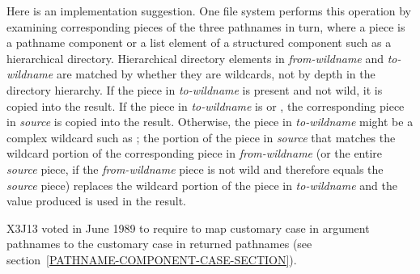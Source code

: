 \begin{newer}
\begin{defun}[Function]
    Here is an implementation suggestion.   One file system performs this operation by
    examining corresponding pieces of the three pathnames in turn, where a piece is a
    pathname component or a list element of a structured component such as
    a hierarchical directory.  Hierarchical directory elements in
    \emph{from-wildname} and \emph{to-wildname} are matched by whether they are
    wildcards, not by depth in the directory hierarchy.  If the piece in
    \emph{to-wildname} is present and not wild, it is copied into the result.
    If the piece in \emph{to-wildname} is  or , the corresponding
    piece in \emph{source} is
    copied into the result.  Otherwise, the piece in \emph{to-wildname} might be
    a complex wildcard such as ; the portion of the piece in \emph{source}
    that matches the
    wildcard portion of the corresponding piece in \emph{from-wildname} (or the entire
    \emph{source} piece, if the \emph{from-wildname} piece is not wild and therefore
    equals the \emph{source} piece) replaces the wildcard
    portion of the piece in \emph{to-wildname} and the value produced is used in
    the result.

X3J13 voted in June 1989  to
require  to map customary case in argument
pathnames to the customary case in returned pathnames
(see section~\ref{PATHNAME-COMPONENT-CASE-SECTION}).


\end{defun}
\end{newer}
